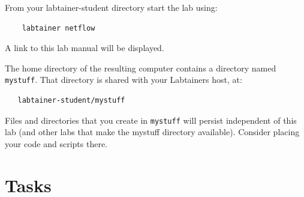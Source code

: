 From your labtainer-student directory start the lab using:
\begin{verbatim}
    labtainer netflow
\end{verbatim}
\noindent A link to this lab manual will be displayed.  

The home directory of the resulting computer contains a directory named {\tt mystuff}.  That directory is shared with your Labtainers host,
at:
\begin{verbatim}
   labtainer-student/mystuff
\end{verbatim}
\noindent Files and directories that you create in {\tt mystuff} will persist independent of this lab (and other labs that make the mystuff
directory available).  Consider placing your code and scripts there.
\section{Tasks}  
